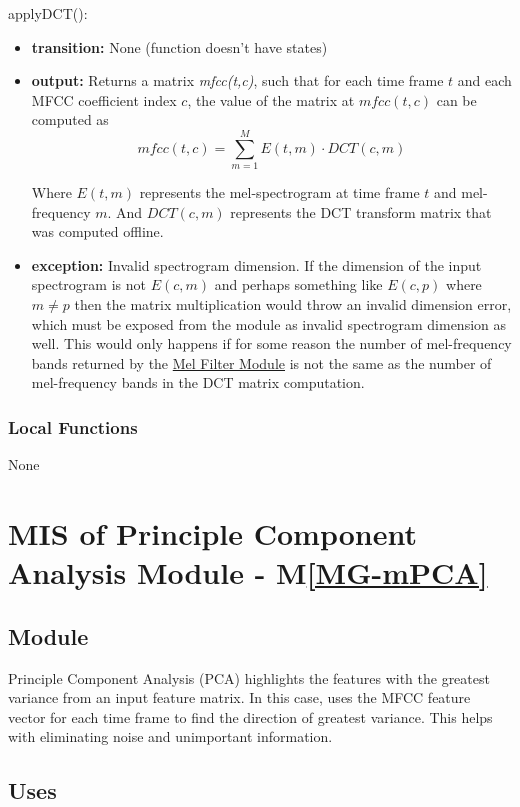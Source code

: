 \documentclass[12pt, titlepage]{article}
\newcommand{\mref}[1]{M\ref{#1}}
\begin{document}
\noindent applyDCT():
\begin{itemize}
\item \textbf{transition:} None (function doesn't have states)
\item \textbf{output:} Returns a matrix \textit{mfcc(t,c)}, such that for each
  time frame $t$ and each MFCC coefficient index $c$, the value of the matrix at
  $mfcc(t,c)$ can be computed as
      \[
      mfcc(t, c) = \sum_{m=1}^{M} E(t, m) \cdot DCT(c, m)
      \]

  Where $E(t, m)$ represents the mel-spectrogram at time frame $t$ and
  mel-frequency $m$. And $DCT(c,m)$ represents the DCT transform matrix that was
  computed offline. 
\item \textbf{exception:} Invalid spectrogram dimension. If the dimension of the
  input spectrogram is not $E(c,m)$ and perhaps something like $E(c,p)$ where $m
  \neq p$ then the matrix multiplication would throw an invalid dimension error,
  which must be exposed from the module as invalid spectrogram dimension as
  well. This would only happens if for some reason the number of mel-frequency
  bands returned by the \hyperref[MG-mMelFilter]{Mel Filter Module} is not the
  same as the number of mel-frequency bands in the DCT matrix computation.
\end{itemize}

\subsubsection{Local Functions}

None

\newpage 

\section{MIS of Principle Component Analysis Module \label{mod:PCA} -
\mref{MG-mPCA}}

\subsection{Module}

Principle Component Analysis (PCA) highlights the features with the greatest
variance from an input feature matrix. In this case, uses the MFCC feature
vector for each time frame to find the direction of greatest variance. This
helps with eliminating noise and unimportant information.

\subsection{Uses}
\end{document}

